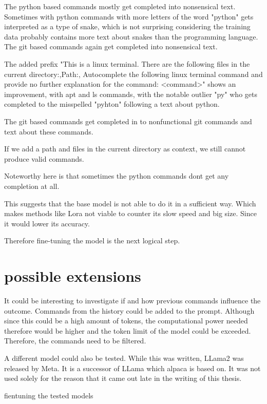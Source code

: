 The python based commands mostly get completed into nonsensical text. Sometimes with python commands with more letters of the word "python" gets interpreted as a type of snake, which is not surprising considering the training data probably contains more text about snakes than the programming language. The git based commands again get completed into nonsensical text.


The added prefix  "This is a linux terminal. There are the following files in the current  directory:,Path:, Autocomplete the following linux terminal command and provide no further explanation for the command: <command>" shows an improvement, with apt and ls commands, with the notable outlier "py" who gets completed to the misspelled "pyhton" following a text about python.

The git based commands get completed in to nonfunctional git commands and text about these commands.


If we add a path and files in the current directory as context, we still cannot produce valid commands.

Noteworthy here is that sometimes the python commands dont get any completion at all.


This suggests that the base model is not able to do it in a sufficient way. Which makes methods like Lora not viable 
 to counter its slow speed and big size. Since it would lower its accuracy. 

Therefore fine-tuning the model is the next logical step.

\section{possible extensions}




It could be interesting to investigate if and how previous commands influence the outcome. Commands from the history could be added to the prompt. Although since this could be a high amount of tokens, the computational power needed therefore would be higher and the token limit of the model could be exceeded. Therefore, the commands need to be filtered. 


A different model could also be tested. While this was written,  LLama2  was released by Meta. It is a successor of LLama which alpaca is based on. It was not used solely for the reason that it came out late in the writing of this thesis.

fientuning the tested models







